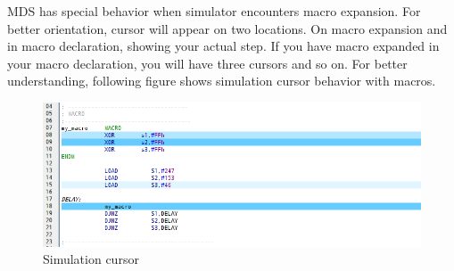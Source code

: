         MDS has special behavior when simulator encounters macro expansion. For better orientation, cursor will appear on two locations.
        On macro expansion and in macro declaration, showing your actual step. If you have macro expanded in your macro declaration, you will have
        three cursors and so on. For better understanding, following figure shows simulation cursor behavior with macros.
        \begin{figure}[h!]
            \centering
            \includegraphics[width=\textwidth]{img/simulationcursor2.png}
            \caption{Simulation cursor}
        \end{figure}


